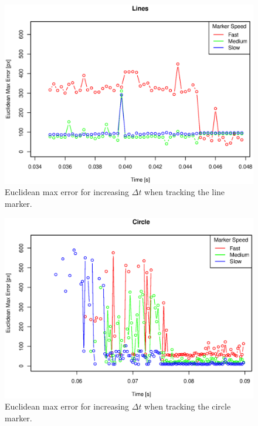 \begin{figure}[H]
\centering
\includegraphics[width= \linewidth]{graphics/robotics/trackingerror_lines}
\caption{Euclidean max error for increasing $\Delta t$ when tracking the line marker.}
\label{fig:trackingerror_lines}
\end{figure}

\begin{figure}[H]
\centering
\includegraphics[width= \linewidth]{graphics/robotics/trackingerror_circle}
\caption{Euclidean max error for increasing $\Delta t$ when tracking the circle marker.}
\label{fig:trackingerror_circle}
\end{figure}

